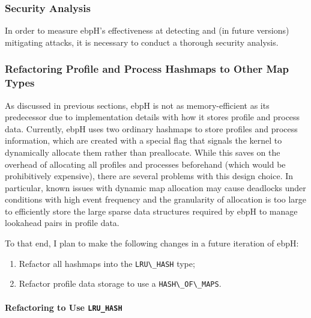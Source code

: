 \documentclass[
  12pt]{findlay}
\newcommand{\passthrough}[1]{#1}
\providecommand{\tightlist}{\setlength{\itemsep}{0pt}\setlength{\parskip}{0pt}}
\begin{document}
\hypertarget{security-analysis}{%
\subsubsection{Security Analysis}\label{security-analysis}}

\label{security_analysis_section}

In order to measure ebpH's effectiveness at detecting and (in future
versions) mitigating attacks, it is necessary to conduct a thorough
security analysis.

\hypertarget{refactoring-profile-and-process-hashmaps-to-other-map-types}{%
\subsubsection{Refactoring Profile and Process Hashmaps to Other Map
Types}\label{refactoring-profile-and-process-hashmaps-to-other-map-types}}

\label{lru_section}

As discussed in previous sections, ebpH is not as memory-efficient as
its predecessor due to implementation details with how it stores profile
and process data. Currently, ebpH uses two ordinary hashmaps to store
profiles and process information, which are created with a special flag
that signals the kernel to dynamically allocate them rather than
preallocate. While this saves on the overhead of allocating all profiles
and processes beforehand (which would be prohibitively expensive), there
are several problems with this design choice. In particular, known
issues with dynamic map allocation may cause deadlocks under conditions
with high event frequency \autocite{starovoitov16prealloc} and the
granularity of allocation is too large to efficiently store the large
sparse data structures required by ebpH to manage lookahead pairs in
profile data.

To that end, I plan to make the following changes in a future iteration
of ebpH:

\begin{enumerate}
\def\labelenumi{\arabic{enumi})}
\tightlist
\item
  Refactor all hashmaps into the \passthrough{\lstinline!LRU\_HASH!}
  type;
\item
  Refactor profile data storage to use a
  \passthrough{\lstinline!HASH\_OF\_MAPS!}.
\end{enumerate}

\hypertarget{refactoring-to-use-lru_hash}{%
\paragraph{\texorpdfstring{Refactoring to Use
\texttt{LRU\_HASH}}{Refactoring to Use LRU\_HASH}}\label{refactoring-to-use-lru_hash}}
\end{document}
